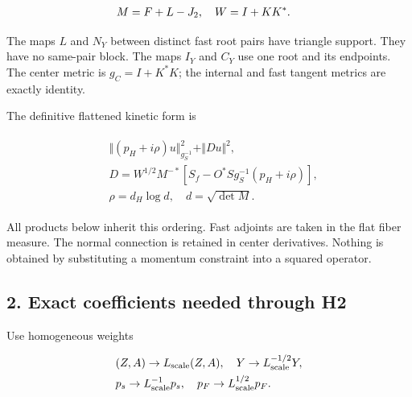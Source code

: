 \begin{gather*}
\begin{aligned}
& M=F+L-J_{2}, \quad  W=I+KK^{*}.
\end{aligned}\notag
\end{gather*}

The maps \(L\) and \(N_{Y}\) between distinct fast root pairs have
triangle support. They have no same-pair block. The maps \(I_{Y}\) and
\(C_{Y}\) use one root and its endpoints. The center metric is
\(g_{C}=I+K^{*}K\); the internal and fast tangent metrics are exactly
identity.

The definitive flattened kinetic form is

\begin{gather*}
\begin{aligned}
& \Vert (p_{H}+i \rho )u\Vert _{g_{S}^{-1}}^{2} + \Vert D u\Vert ^{2}, \\
& D=W^{1/2}M^{-*}[S_{f}-O^{*}Sg_{S}^{-1}(p_{H}+i \rho )], \\
& \rho =d_{H} \log  d, \quad  d=\sqrt{\det  M}.
\end{aligned}\tag{1.1}
\end{gather*}

All products below inherit this ordering. Fast adjoints are taken in the
flat fiber measure. The normal connection is retained in center
derivatives. Nothing is obtained by substituting a momentum constraint
into a squared operator.

\subsection{2. Exact coefficients needed through
H2}\label{d-exact-coefficients-needed-through-h2}

Use homogeneous weights

\begin{gather*}
\begin{aligned}
& (Z,A) \to  L_{\mathrm{scale}} (Z,A), \quad  Y \to  L_{\mathrm{scale}}^{-1/2} Y, \\
& p_{s} \to  L_{\mathrm{scale}}^{-1} p_{s}, \quad  p_{F} \to  L_{\mathrm{scale}}^{1/2} p_{F}.
\end{aligned}\notag
\end{gather*}

